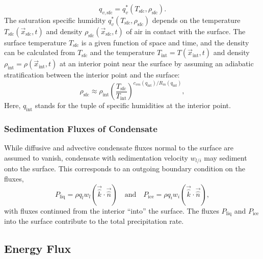 \documentclass{report}
\begin{document}
\begin{enumerate}
     \[
    q_{v, \mathrm{sfc}} =q_v^*(T_\mathrm{sfc}, \rho_\mathrm{sfc}).
    \]
    The saturation specific humidity $q_v^*(T_\mathrm{sfc}, \rho_\mathrm{sfc})$ depends on the temperature $T_\mathrm{sfc}(\vec{x}_\mathrm{sfc}, t)$ and density $\rho_\mathrm{sfc}(\vec{x}_\mathrm{sfc}, t)$ of air in contact with the surface. The surface temperature $T_\mathrm{sfc}$ is a given function of space and time, and the density can be calculated from $T_\mathrm{sfc}$ and the temperature $T_\mathrm{int} = T(\vec{x}_\mathrm{int}, t)$ and density $\rho_\mathrm{int} = \rho(\vec{x}_\mathrm{int}, t)$ at an interior point near the surface by assuming an adiabatic stratification between the interior point and the surface:
    \begin{equation}\label{e:sfc_density}
    \rho_\mathrm{sfc} \approx \rho_\mathrm{int} \left( \frac{T_\mathrm{sfc}}{T_\mathrm{int}} \right)^{c_{vm}(q_\mathrm{int})/R_m(q_\mathrm{int})},
    \end{equation}
    Here, $q_\mathrm{int}$ stands for the tuple of specific humidities at the interior point.
\end{enumerate}

\subsubsection{Sedimentation Fluxes of Condensate}

While diffusive and advective condensate fluxes normal to the surface are assumed to vanish, condensate with sedimentation velocity $w_{l/i}$ may sediment onto the surface. This corresponds to an outgoing boundary condition on the fluxes,
\begin{equation}
    P_{\mathrm{liq}} = \rho q_{l} w_{l} (\vec{\hat k} \cdot \vec{\hat n}) \quad \text{and} \quad  P_{\mathrm{ice}} = \rho q_{i} w_{i} (\vec{\hat k} \cdot \vec{\hat n}),
\end{equation}
with fluxes continued from the interior ``into'' the surface. The fluxes $P_{\mathrm{liq}}$ and $P_{\mathrm{ice}}$ into the surface contribute to the total precipitation rate.

\subsection{Energy Flux}
\end{document}
